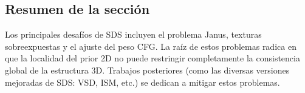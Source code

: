\subsection{Resumen de la sección}

Los principales desafíos de SDS incluyen el problema Janus, texturas sobreexpuestas y el ajuste del peso CFG. La raíz de estos problemas radica en que la localidad del prior 2D no puede restringir completamente la consistencia global de la estructura 3D. Trabajos posteriores (como las diversas versiones mejoradas de SDS: VSD, ISM, etc.) se dedican a mitigar estos problemas.

\newpage

